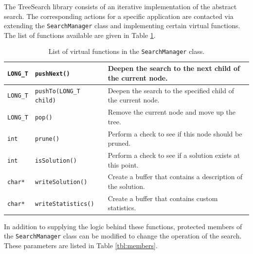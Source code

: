 \documentclass[11pt]{article}
\def\TreeSearch{{TreeSearch}}
\begin{document}
The {\TreeSearch} library consists of an iterative implementation of the abstract search.
The corresponding actions for a specific application are contacted via extending 
	the \texttt{SearchManager} class and implementing certain virtual functions.
The list of functions available are given in Table \ref{tbl:functions}.

	
\begin{table}[htb]\centering
\begin{tabular}[H]{|ll|p{3in}|}
	\hline
	\texttt{LONG\_T} & \texttt{pushNext()} & 
		Deepen the search to the next child of the current node.\\
	\hline
	\texttt{LONG\_T} & \texttt{pushTo(LONG\_T child)} & 
		Deepen the search to the specified child of the current node.\\
	\hline
	\texttt{LONG\_T} & \texttt{pop()} & 
		Remove the current node and move up the tree.\\
	\hline
	\texttt{int} & \texttt{prune()}  & 
		Perform a check to see if this node should be pruned.\\
	\hline
	\texttt{int} & \texttt{isSolution()} & 
		Perform a check to see if a solution exists at this point.\\
	\hline
	\texttt{char*} & \texttt{writeSolution()} & 
		Create a buffer that contains a description of the solution.\\
	\hline
	\texttt{char*} & \texttt{writeStatistics()}  & 
		Create a buffer that contains custom statistics.\\
	\hline
\end{tabular}
\caption{\label{tbl:functions}List of virtual functions in the \texttt{SearchManager} class.}
\end{table}


In addition to supplying the logic behind these functions, 
	protected members of the \texttt{SearchManager} class can be modified to change the
	operation of the search.
These parameters are listed in Table \ref{tbl:members}.
\end{document}
